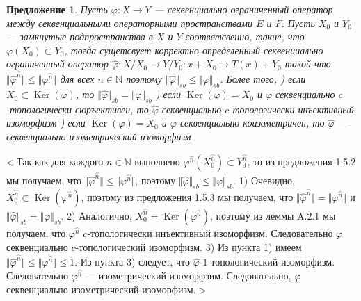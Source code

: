 \documentclass[12pt]{article}
\newtheorem{proposition}[theorem]{Предложение}
\newenvironment{proof}{\par $\triangleleft$}{$\triangleright$}
\begin{document}
\begin{proposition}\label{PrFactorSQOp} 
Пусть $\varphi:X\to Y$ --- секвенциально ограниченный оператор между секвенциальными операторными пространствами $E$ и $F$. Пусть $X_0$ и $Y_0$ --- замкнутые подпространства в $X$ и $Y$ соответсвенно, такие, что $\varphi(X_0)\subset Y_0$, тогда сущетсвует корректно определенный секвенциально ограниченный оператор $\widehat{\varphi}:X/X_0\to Y/Y_0:x+X_0\mapsto T(x)+Y_0$ такой что $\Vert\widehat{\varphi}^{\wideparen{n}}\Vert\leq\Vert \varphi^{\wideparen{n}}\Vert$ для всех $n\in\mathbb{N}$ поэтому $\Vert\widehat{\varphi}\Vert_{sb}\leq\Vert \varphi\Vert_{sb}$. Более того,
) если $X_0\subset \operatorname{Ker}(\varphi)$, то  $\Vert\widehat{\varphi}\Vert_{sb}=\Vert \varphi\Vert_{sb}$
) если $\operatorname{Ker}(\varphi)= X_0$ и $\varphi$ секвенциально $c$-топологически сюръективен, то $\widehat{\varphi}$ секвенциально $c$-топологически инъективный изоморфизм
) если $\operatorname{Ker}(\varphi)= X_0$ и $\varphi$ секвенциально коизометричен, то $\widehat{\varphi}$ --- секвенциально изометрический изоморфизм
\end{proposition}
\begin{proof}
Так как для каждого $n\in\mathbb{N}$ выполнено $\varphi^{\widehat{n}}(X_0^{\wideparen{n}})\subset Y_0^{\wideparen{n}}$, то из предложения 1.5.2 \cite{HelFA} мы получаем, что $\Vert\widehat{\varphi}^{\wideparen{n}}\Vert\leq\Vert \varphi^{\wideparen{n}}\Vert$, поэтому $\Vert\wideparen{\varphi}\Vert_{sb}\leq\Vert\varphi\Vert_{sb}$. 1) Очевидно, $X_0^{\wideparen{n}}\subset\operatorname{Ker}(\varphi^{\wideparen{n}})$, поэтому из предложения 1.5.3 \cite{HelFA} мы получаем, что $\Vert\widehat{\varphi}^{\wideparen{n}}\Vert=\Vert \varphi^{\wideparen{n}}\Vert$ и $\Vert\wideparen{\varphi}\Vert_{sb}=\Vert\varphi\Vert_{sb}$. 2) Аналогично, $X_0^{\wideparen{n}}=\operatorname{Ker}(\varphi^{\wideparen{n}})$, поэтому из леммы A.2.1 \cite{EROpSp} мы получаем, что $\varphi^{\wideparen{n}}$ $c$-топологически инъективный изоморфизм. Следовательно $\varphi$ секвенциально $c$-топологический изоморфизм. 3) Из пункта 1) имеем $\Vert\widehat{\varphi}^{\wideparen{n}}\Vert\leq\Vert \varphi^{\wideparen{n}}\Vert\leq 1$. Из пункта 3) следует, что $\widehat{\varphi}$ $1$-топологический изоморфизм. Следовательно $\varphi^{\wideparen{n}}$ --- изометрический изоморфзим. Следовательно, $\varphi$ секвенциально изометрический изоморфизм.
\end{proof}
\end{document}
